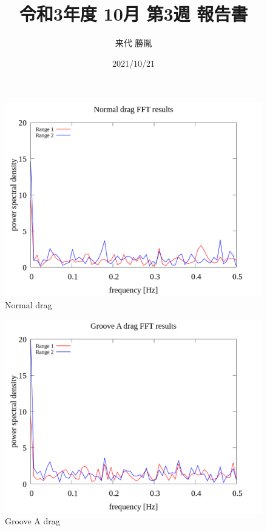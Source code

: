 \documentclass[a4paper]{jsarticle}
\author{来代 勝胤}
\title{令和3年度 10月 第3週 報告書}
\date{2021/10/21}
\begin{document}
\maketitle
\begin{figure}[htbp]
    \footnotesize
    \begin{center}
        \includegraphics[width=130mm]{../images/Normal_drag_08.png}
        \caption{Normal drag}
    \end{center}
\end{figure}

\begin{figure}[htbp]
    \footnotesize
    \begin{center}
        \includegraphics[width=130mm]{../images/Groove_A_drag_08.png}
        \caption{Groove A drag}
    \end{center}
\end{figure}
\end{document}
